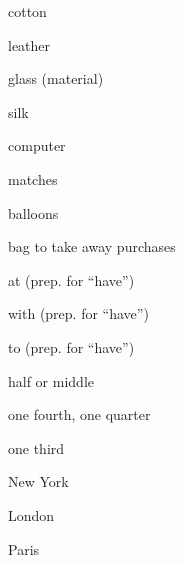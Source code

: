 \begin{flashcard}{\LARGE cotton}
\LARGE {}
\end{flashcard}
\begin{flashcard}{\LARGE leather}
\LARGE {}
\end{flashcard}
\begin{flashcard}{\LARGE glass (material)}
\LARGE {}
\end{flashcard}
\begin{flashcard}{\LARGE silk}
\LARGE {}
\end{flashcard}
\begin{flashcard}{\LARGE computer}
\LARGE {}
\end{flashcard}
\begin{flashcard}{\LARGE matches}
\LARGE {}
\end{flashcard}
\begin{flashcard}{\LARGE balloons}
\LARGE {}
\end{flashcard}
\begin{flashcard}{\LARGE bag to take away purchases}
\LARGE {}
\end{flashcard}
\begin{flashcard}{\LARGE at (prep. for ``have'')}
\LARGE {}
\end{flashcard}
\begin{flashcard}{\LARGE with (prep. for ``have'')}
\LARGE {}
\end{flashcard}
\begin{flashcard}{\LARGE to (prep. for ``have'')}
\LARGE {}
\end{flashcard}
\begin{flashcard}{\LARGE half or middle}
\LARGE {}
\end{flashcard}
\begin{flashcard}{\LARGE one fourth, one quarter}
\LARGE {}
\end{flashcard}
\begin{flashcard}{\LARGE one third}
\LARGE {}
\end{flashcard}
\begin{flashcard}{\LARGE New York}
\LARGE {}
\end{flashcard}
\begin{flashcard}{\LARGE London}
\LARGE {}
\end{flashcard}
\begin{flashcard}{\LARGE Paris}
\LARGE {}
\end{flashcard}

